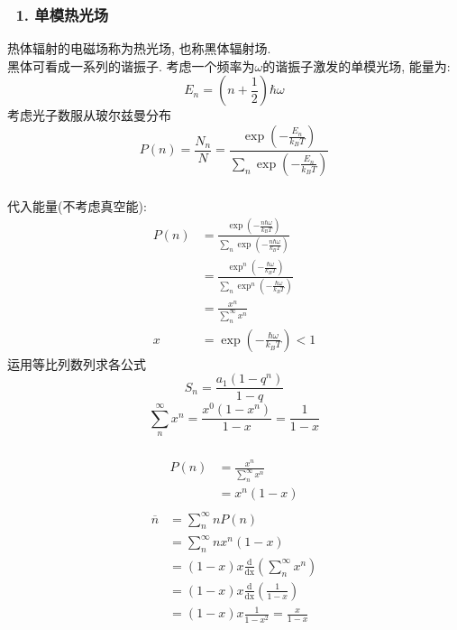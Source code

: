\begin{frame}
 \frametitle{~1. 单模热光场}
    热体辐射的电磁场称为热光场, 也称黑体辐射场. \\ 
    黑体可看成一系列的谐振子. 考虑一个频率为$\omega$的谐振子激发的单模光场, 能量为:
    \[ E_n = (n+\frac{1}{2}) \hbar \omega \] 
    考虑光子数服从玻尔兹曼分布
    \begin{equation*}
        P(n) =\frac{N_{n}}{N}=\frac{\exp \left(-\frac{E_{n}}{k_B T}\right)}{\sum_{n} \exp \left(-\frac{E_{n}}{k_B T}\right)}
    \end{equation*}
\end{frame}

\begin{frame}
 \frametitle{}
 代入能量(不考虑真空能):
    \[\begin{aligned}
     P(n) &=\frac{\exp \left(-\frac{n \hbar \omega }{k_B T}\right)}{\sum_{n} \exp \left(-\frac{n \hbar \omega }{k_B T}\right)} \\ 
     &= \frac{\exp^n \left(-\frac{\hbar \omega }{k_B T}\right)}{\sum_{n} \exp^n \left(-\frac{\hbar \omega }{k_B T}\right)} \\ 
     &= \frac{x^n}{\sum_{n} ^\infty x^n } \\ 
     x&= \exp \left(-\frac{\hbar \omega }{k_B T}\right) <1
    \end{aligned} \]
运用等比列数列求各公式
\[ S_n= \frac{a_1(1-q^n)}{1-q} \]
    \[\sum_{n} ^\infty x^n = \frac{x^0(1-x^n)}{1-x} = \frac{1}{1-x}\] 
\end{frame}

\begin{frame}
 \frametitle{}
 \[\begin{aligned}
    P(n) &= \frac{x^n}{\sum_{n} ^\infty x^n } \\ 
    &= x^n (1-x) \\ 
   \end{aligned} \]
   \[\begin{aligned}
    \overline{n} &= \sum_{n} ^\infty  n P(n)  \\ 
    &= \sum_{n} ^\infty  n x^n (1-x) \\ 
    &= (1-x)x \frac{\mathrm{d} }{\mathrm{dx}}\left( \sum_{n} ^\infty x^n \right)  \\
    &=  (1-x)x \frac{\mathrm{d} }{\mathrm{dx}}\left( \frac{1}{1-x} \right) \\
    &=  (1-x)x \frac{1} {1-x^2} = \frac{x}{1-x} \\ 
   \end{aligned} \]
\end{frame}

